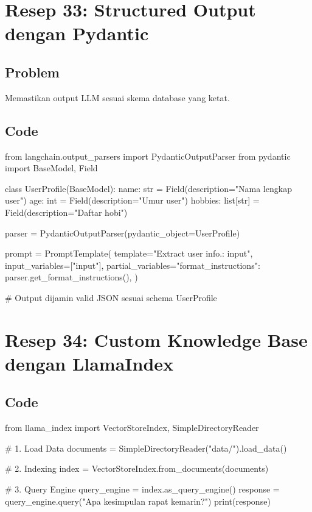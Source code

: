 \newpage

\section{Resep 33: Structured Output dengan Pydantic}

\subsection*{Problem}
Memastikan output LLM sesuai skema database yang ketat.

\subsection*{Code}
\begin{codeblock}[language=Python]
from langchain.output_parsers import PydanticOutputParser
from pydantic import BaseModel, Field

class UserProfile(BaseModel):
    name: str = Field(description="Nama lengkap user")
    age: int = Field(description="Umur user")
    hobbies: list[str] = Field(description="Daftar hobi")

parser = PydanticOutputParser(pydantic_object=UserProfile)

prompt = PromptTemplate(
    template="Extract user info.\nInput: {input}",
    input_variables=["input"],
    partial_variables={"format_instructions": parser.get_format_instructions()},
)

# Output dijamin valid JSON sesuai schema UserProfile
\end{codeblock}

\newpage

\section{Resep 34: Custom Knowledge Base dengan LlamaIndex}

\subsection*{Code}
\begin{codeblock}[language=Python]
from llama_index import VectorStoreIndex, SimpleDirectoryReader

# 1. Load Data
documents = SimpleDirectoryReader("data/").load_data()

# 2. Indexing
index = VectorStoreIndex.from_documents(documents)

# 3. Query Engine
query_engine = index.as_query_engine()
response = query_engine.query("Apa kesimpulan rapat kemarin?")
print(response)
\end{codeblock}

